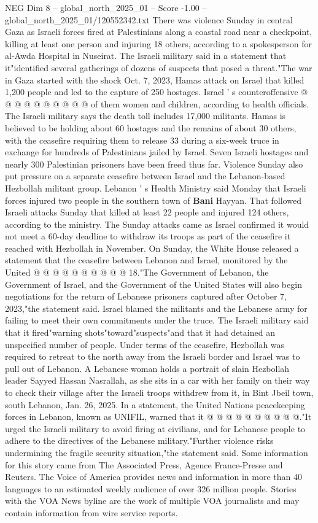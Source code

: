 \begin{textsample}{NEG Dim 8 – global\_north\_2025\_01 – Score -1.00 – global\_north\_2025\_01/120552342.txt}
There was violence Sunday in central Gaza as Israeli forces fired at Palestinians along a coastal road near a checkpoint, killing at least one person and injuring 18 others, according to a spokesperson for al-Awda Hospital in Nuseirat.
The Israeli military said in a statement that it"identified several gatherings of dozens of suspects that posed a threat."The war in Gaza started with the shock Oct. 7, 2023, Hamas attack on Israel that killed 1,200 people and led to the capture of 250 hostages.
Israel ' s counteroffensive @ @ @ @ @ @ @ @ @ @ of them women and children, according to health officials.
The Israeli military says the death toll includes 17,000 militants.
Hamas is believed to be holding about 60 hostages and the remains of about 30 others, with the ceasefire requiring them to release 33 during a six-week truce in exchange for hundreds of Palestinians jailed by Israel.
Seven Israeli hostages and nearly 300 Palestinian prisoners have been freed thus far.
Violence Sunday also put pressure on a separate ceasefire between Israel and the Lebanon-based Hezbollah militant group.
Lebanon ' s Health Ministry said Monday that Israeli forces injured two people in the southern town of \textbf{Bani} Hayyan.
That followed Israeli attacks Sunday that killed at least 22 people and injured 124 others, according to the ministry.
The Sunday attacks came as Israel confirmed it would not meet a 60-day deadline to withdraw its troops as part of the ceasefire it reached with Hezbollah in November.
On Sunday, the White House released a statement that the ceasefire between Lebanon and Israel, monitored by the United @ @ @ @ @ @ @ @ @ @ 18."The Government of Lebanon, the Government of Israel, and the Government of the United States will also begin negotiations for the return of Lebanese prisoners captured after October 7, 2023,"the statement said.
Israel blamed the militants and the Lebanese army for failing to meet their own commitments under the truce.
The Israeli military said that it fired"warning shots"toward"suspects"and that it had detained an unspecified number of people.
Under terms of the ceasefire, Hezbollah was required to retreat to the north away from the Israeli border and Israel was to pull out of Lebanon.
A Lebanese woman holds a portrait of slain Hezbollah leader Sayyed Hassan Nasrallah, as she sits in a car with her family on their way to check their village after the Israeli troops withdrew from it, in Bint Jbeil town, south Lebanon, Jan. 26, 2025.
In a statement, the United Nations peacekeeping forces in Lebanon, known as UNIFIL, warned that it @ @ @ @ @ @ @ @ @ @."It urged the Israeli military to avoid firing at civilians, and for Lebanese people to adhere to the directives of the Lebanese military."Further violence risks undermining the fragile security situation,"the statement said.
Some information for this story came from The Associated Press, Agence France-Presse and Reuters.
The Voice of America provides news and information in more than 40 languages to an estimated weekly audience of over 326 million people.
Stories with the VOA News byline are the work of multiple VOA journalists and may contain information from wire service reports.

\end{textsample}
